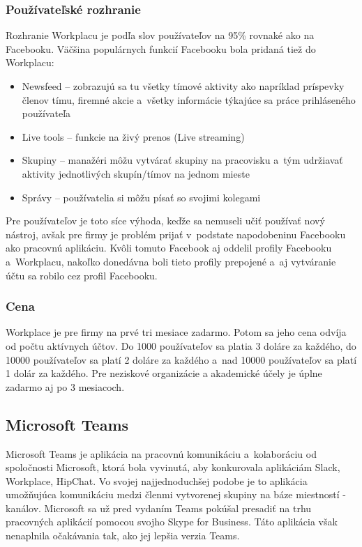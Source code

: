 \subsubsection{Používateľské rozhranie}
\indent Rozhranie Workplacu je podľa slov používateľov na 95\% rovnaké ako na Facebooku. Väčšina populárnych funkcií Facebooku bola pridaná tiež do Workplacu:
\begin{itemize}
    \item Newsfeed – zobrazujú sa tu všetky tímové aktivity ako napríklad príspevky členov tímu, firemné akcie a všetky informácie týkajúce sa práce prihláseného používateľa
    \item Live tools – funkcie na živý prenos (Live streaming)
    \item Skupiny – manažéri môžu vytvárať skupiny na pracovisku a tým udržiavať aktivity jednotlivých skupín/tímov na jednom  mieste
    \item Správy – používatelia si môžu písať so svojimi kolegami
\end{itemize}

\indent Pre používateľov je toto síce výhoda, keďže sa nemuseli učiť používať nový nástroj, avšak pre firmy je problém prijať v podstate napodobeninu Facebooku ako pracovnú aplikáciu. Kvôli tomuto Facebook aj oddelil profily Facebooku a Workplacu, nakoľko donedávna boli tieto profily prepojené a aj vytváranie účtu sa robilo cez profil Facebooku. 
\subsubsection{Cena}
\indent Workplace je pre firmy na prvé tri mesiace zadarmo. Potom sa jeho cena odvíja od počtu aktívnych účtov. Do 1000 používateľov sa platia 3 doláre za každého, do 10000 používateľov sa platí 2 doláre za každého a nad 10000 používateľov sa platí 1 dolár za každého.  Pre neziskové organizácie a akademické účely je úplne zadarmo aj po 3 mesiacoch.

\subsection{Microsoft Teams}
\indent Microsoft Teams je aplikácia na pracovnú komunikáciu a kolaboráciu od spoločnosti Microsoft, ktorá bola vyvinutá, aby konkurovala aplikáciám Slack, Workplace, HipChat. Vo svojej najjednoduchšej podobe je to aplikácia umožňujúca komunikáciu medzi členmi vytvorenej skupiny na báze miestností - kanálov. Microsoft sa už pred vydaním Teams pokúšal presadiť na trhu pracovných aplikácií pomocou svojho Skype for Business. Táto aplikácia však nenaplnila očakávania tak, ako jej lepšia verzia Teams. 
